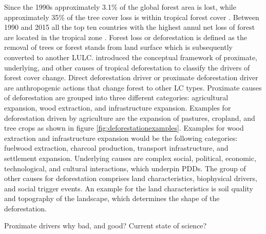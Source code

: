 	Since the 1990s approximately 3.1\% of the global forest area is lost, while approximately 35\% of the tree cover loss is within tropical forest cover \citep{FAO2016}. Between 1990 and 2015 all the top ten countries with the highest annul net loss of forest are located in the tropical zone \citep{FAO2010,FAO2016}. Forest loss or deforestation is defined as the removal of trees or forest stands from land surface which is subsequently converted to another \ac{LULC}. \citet{Geist2001} introduced the conceptual framework of proximate, underlying, and other causes of tropical deforestation to classify the drivers of forest cover change. Direct deforestation driver or proximate deforestation driver are anthropogenic actions that change forest to other \ac{LC} types. Proximate causes of deforestation are grouped into three different categories: agricultural expansion, wood extraction, and infrastructure expansion. Examples for deforestation driven by agriculture are the expansion of pastures, cropland, and tree crops as shown in figure \ref{fig:deforestationexamples}. Examples for wood extraction and infrastructure expansion would be the following categories: fuelwood extraction, charcoal production, transport infrastructure, and settlement expansion. Underlying causes are complex social, political, economic, technological, and cultural interactions, which underpin \acp{PDD}. The group of other causes for deforestation comprises land characteristics, biophysical drivers, and social trigger events. An example for the land characteristics is soil quality and topography of the landscape, which determines the shape of the deforestation. 

	Proximate drivers why bad, and good?
	Current state of science?

